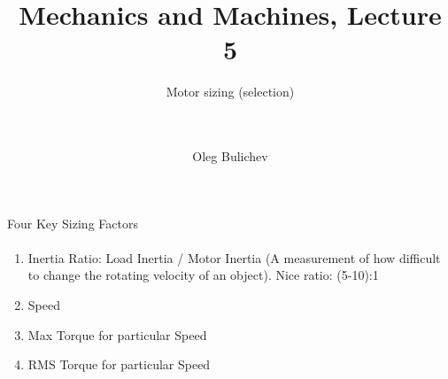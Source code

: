 \documentclass[aspectratio=169]{beamer}
\title[MaM]{Mechanics and Machines, Lecture 5} %
\subtitle{Motor sizing (selection)
\\ \        \\ \   
         } %
\author{Oleg Bulichev}
\newcommand{\fbckg}[1]{\usebackgroundtemplate{\texttt{[image: \#1]}}}%
\begin{document}
\setlength{\abovedisplayskip}{0pt}
\setlength{\belowdisplayskip}{0pt}
\setlength{\abovedisplayshortskip}{0pt}
\setlength{\belowdisplayshortskip}{0pt}

\fbckg{fibeamer/figs/title_page.png}

\fbckg{fibeamer/figs/common.png}

\note{\scriptsize \begin{itemize}
        \item \ 
    \end{itemize}}

\begin{frame}[t]{Four Key Sizing Factors}
\framesubtitle{}
    \begin{enumerate}
        \item Inertia Ratio: Load Inertia / Motor Inertia (A measurement of how difficult to change the rotating velocity of an object). Nice ratio: (5-10):1
        \item Speed
        \item Max Torque for particular Speed
        \item RMS Torque for particular Speed
    \end{enumerate}
\end{frame}
\end{document}
